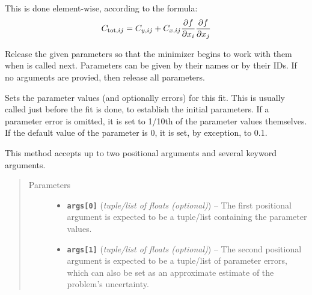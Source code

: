 \documentclass[a4paper,10pt,english]{sphinxmanual}
\begin{document}
\begin{fulllineitems}
\begin{fulllineitems}
This is done element-wise, according to the formula:
\begin{gather}
\begin{split}C_{\text{tot}, ij} = C_{y, ij} + C_{x, ij}
\frac{\partial f}{\partial x_i}  \frac{\partial f}{\partial x_j}\end{split}\notag
\end{gather}
\end{fulllineitems}


\begin{fulllineitems}
\label{index:kafe.fit.Fit.release_parameters}
Release the given parameters so that the minimizer begins to work with
them when  is called next. Parameters can be given by
their
names or by their IDs. If no arguments are provied, then release all
parameters.

\end{fulllineitems}


\begin{fulllineitems}
\label{index:kafe.fit.Fit.set_parameters}
Sets the parameter values (and optionally errors) for this fit.
This is usually called just before the fit is done, to establish
the initial parameters. If a parameter error is omitted, it is
set to 1/10th of the parameter values themselves. If the default
value of the parameter is 0, it is set, by exception, to 0.1.

This method accepts up to two positional arguments and several
keyword arguments.
\begin{quote}\begin{description}
\item[{Parameters}] \leavevmode\begin{itemize}
\item {} 
\textbf{\texttt{args{[}0{]}}} (\emph{tuple/list of floats (optional)}) -- The first positional argument is expected to be
a tuple/list containing the parameter values.

\item {} 
\textbf{\texttt{args{[}1{]}}} (\emph{tuple/list of floats (optional)}) -- The second positional argument is expected to be a
tuple/list of parameter errors, which can also be set as an
approximate estimate of the problem's uncertainty.


\end{itemize}
\end{description}
\end{quote}
\end{fulllineitems}
\end{fulllineitems}
\end{document}

